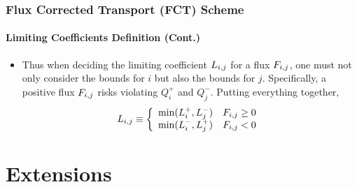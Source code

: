 \documentclass{beamer}
\begin{document}
\begin{frame}
\frametitle{Flux Corrected Transport (FCT) Scheme}
\framesubtitle{Limiting Coefficients Definition (Cont.)}

\begin{itemize}
   \item Thus when deciding the limiting coefficient $L_{i,j}$ for a flux $F_{i,j}$, 
      one must not only consider the bounds for $i$ but also the bounds for $j$.
      Specifically, a positive flux $F_{i,j}$ risks violating $Q_i^+$ and $Q_j^-$.
      Putting everything together,
      \begin{equation}
         L_{i,j} \equiv\left\{
            \begin{array}{l l}
               \min(L_i^+,L_j^-) & F_{i,j} \geq 0\\
               \min(L_i^-,L_j^+) & F_{i,j} < 0
            \end{array}
            \right.
      \end{equation}
\end{itemize}

\end{frame}
\section{Extensions}
\end{document}
